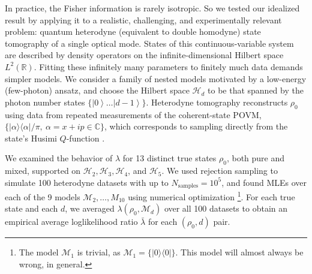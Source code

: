 \documentclass[aps,pra, twocolumn]{revtex4}
\newcommand{\M}{\mathcal{M}}
\newcommand{\reals}{\mathbb{R}}
\newcommand{\ket}[1]{\ensuremath{\left|#1\right\rangle}}
\begin{document}
In practice, the Fisher information is rarely isotropic.  So we tested our idealized result by applying it to a realistic, challenging, and experimentally relevant problem: quantum heterodyne (equivalent to double homodyne) state tomography \cite{Lvovsky2001a, Bertrand1987, Leonhardt1995, Lvovsky2009} of a single optical mode.  States of this continuous-variable system are described by density operators on the infinite-dimensional Hilbert space $L^2(\reals)$.  Fitting these infinitely many parameters to finitely much data demands simpler models.
We consider a family of nested models motivated by a low-energy (few-photon) ansatz, and choose   
the Hilbert space $\mathcal{H}_d$ to be that spanned by the photon number states $\{\ket{0}\ldots\ket{d-1}\}$.
Heterodyne tomography reconstructs $\rho_{0}$ using data from repeated measurements of the 
coherent-state POVM, $\{|\alpha\rangle\langle \alpha| /\pi, ~\alpha=x+ip\in \mathbb{C}\}$, which corresponds to sampling directly from the 
state's Husimi $Q$-function \cite{Husimi1940}.

We examined the behavior of $\lambda$ for 13 distinct true states $\rho_{0}$, both pure and mixed, supported on $\mathcal{H}_{2}, \mathcal{H}_{3}, \mathcal{H}
_{4}$, and $\mathcal{H}_{5}$.  We used rejection sampling to simulate 100 heterodyne datasets with up to $N_{\mathrm{samples}}=10^5$, and found MLEs over each of the 9 models $\M_2, \ldots, M_{10}$ using numerical optimization \footnote{The model $\M_{1}$ is trivial, as $\M_{1} = \{|0\rangle \langle 0|\}$. This model will almost always be wrong, in general.}.  For each true state and each $d$, we averaged $\lambda(\rho_{0}, \M_{d})$ over all 100 datasets to obtain an empirical average loglikelihood ratio $\bar{\lambda}$ for each $(\rho_0,d)$ pair.
\end{document}
